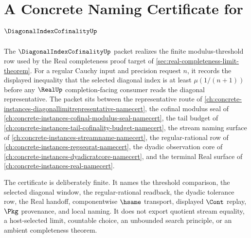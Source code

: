 \chapter{A Concrete Naming Certificate for $\DiagonalIndexCofinalityUp$}
\label{ch:concrete-instances-diagonal-index-cofinality-namecert}

The $\DiagonalIndexCofinalityUp$ packet realizes the finite modulus-threshold row used by the Real completeness proof target of \autoref{sec:real-completeness-limit-theorem}. For a regular Cauchy input and precision request $n$, it records the displayed inequality that the selected diagonal index is at least $\mu(1/(n+1))$ before any $\RealUp$ completion-facing consumer reads the diagonal representative. The packet sits between the representative route of \autoref{ch:concrete-instances-diagonallimitrepresentative-namecert}, the cofinal modulus seal of \autoref{ch:concrete-instances-cofinal-modulus-seal-namecert}, the tail budget of \autoref{ch:concrete-instances-tail-cofinality-budget-namecert}, the stream naming surface of \autoref{ch:concrete-instances-streamname-namecert}, the regular-rational row of \autoref{ch:concrete-instances-regseqrat-namecert}, the dyadic observation core of \autoref{ch:concrete-instances-dyadicratcore-namecert}, and the terminal Real surface of \autoref{ch:concrete-instances-real-namecert}.

The certificate is deliberately finite. It names the threshold comparison, the selected diagonal window, the regular-rational readback, the dyadic tolerance row, the Real handoff, componentwise $\hsame$ transport, displayed $\Cont$ replay, $\Pkg$ provenance, and local naming. It does not export quotient stream equality, a host-selected limit, countable choice, an unbounded search principle, or an ambient completeness theorem.


